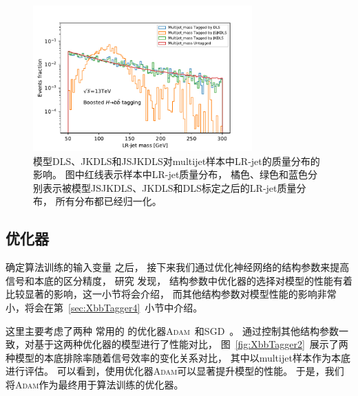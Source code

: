 \begin{figure}
  \begin{center}
    \includegraphics[width=0.75\textwidth]{figuresXbb/XbbTagger1.pdf}
  \end{center}
  \caption{
模型DLS、JKDLS和JSJKDLS对multijet样本中LR-jet的质量分布的影响。
图中红线表示样本中LR-jet质量分布，
橘色、绿色和蓝色分别表示被模型JSJKDLS、JKDLS和DLS标定之后的LR-jet质量分布，
所有分布都已经归一化。
  }
    \label{fig:XbbTagger1}
\end{figure}


\subsection{优化器}
\label{sec:XbbTagger2}

确定算法训练的输入变量
之后，
接下来我们通过优化神经网络的结构参数来提高信号和本底的区分精度，
研究
发现，
结构参数中优化器的选择对模型的性能有着比较显著的影响，这一小节将会介绍，
而其他结构参数对模型性能的影响非常小，将会在第~\ref{sec:XbbTagger4}~小节中介绍。

这里主要考虑了两种
常用的
的优化器\textsc{Adam}~\cite{Kingma:2014}和\textsc{SGD}~\cite{SGD}。
通过控制其他结构参数一致，对基于这两种优化器的模型进行了性能对比，
图~\ref{fig:XbbTagger2}~展示了两种模型的本底排除率随着信号效率的变化关系对比，
其中以multijet样本作为本底进行评估。
可以看到，使用优化器\textsc{Adam}可以显著提升模型的性能。
于是，我们将\textsc{Adam}作为最终用于算法训练的优化器。


